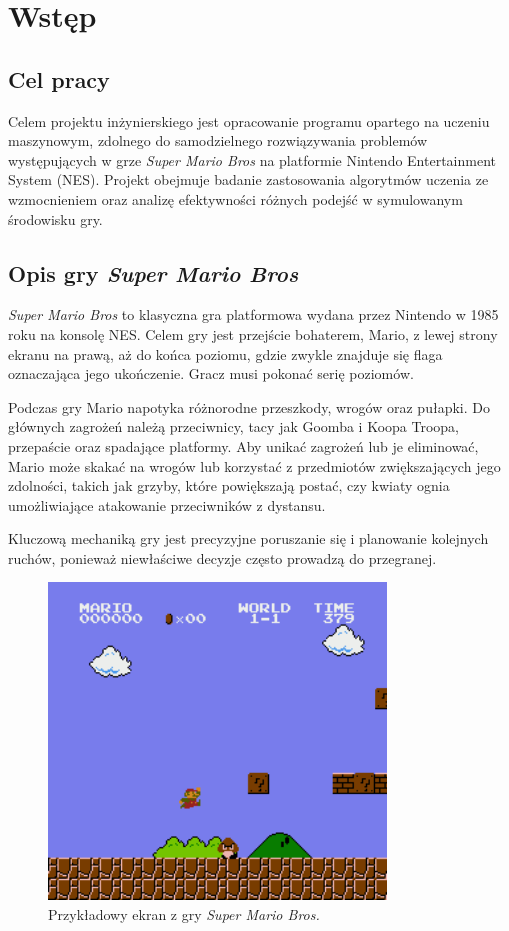\chapter{Wstęp}

\section{Cel pracy}
Celem projektu inżynierskiego jest opracowanie programu opartego na uczeniu maszynowym, zdolnego do samodzielnego rozwiązywania problemów występujących w grze \textit{Super Mario Bros} na platformie Nintendo Entertainment System (NES).
Projekt obejmuje badanie zastosowania algorytmów uczenia ze wzmocnieniem oraz analizę efektywności różnych podejść w symulowanym środowisku gry.

\section{Opis gry \textit{Super Mario Bros}}

\textit{Super Mario Bros} to klasyczna gra platformowa wydana przez Nintendo w 1985 roku na konsolę NES.
Celem gry jest przejście bohaterem, Mario, z lewej strony ekranu na prawą, aż do końca poziomu, gdzie zwykle znajduje się flaga oznaczająca jego ukończenie.
Gracz musi pokonać serię poziomów.

Podczas gry Mario napotyka różnorodne przeszkody, wrogów oraz pułapki.
Do głównych zagrożeń należą przeciwnicy, tacy jak Goomba i Koopa Troopa, przepaście oraz spadające platformy.
Aby unikać zagrożeń lub je eliminować, Mario może skakać na wrogów lub korzystać z przedmiotów zwiększających jego zdolności, takich jak grzyby, które powiększają postać, czy kwiaty ognia umożliwiające atakowanie przeciwników z dystansu.

Kluczową mechaniką gry jest precyzyjne poruszanie się i planowanie kolejnych ruchów, ponieważ niewłaściwe decyzje często prowadzą do przegranej.

\begin{figure}[h!]
    \centering
    \includegraphics[width=0.8\textwidth]{img/screenshot_mario.png}
    \caption{Przykładowy ekran z gry \textit{Super Mario Bros.}}
    \label{fig:screenshot_mario}
\end{figure}

